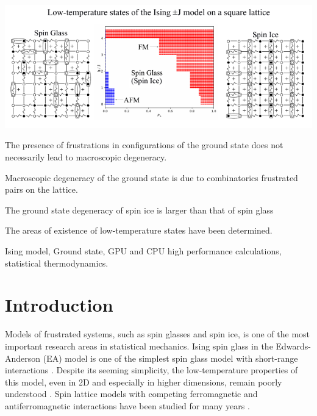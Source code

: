 \documentclass[preprint,12pt]{elsarticle}
\begin{document}
\begin{frontmatter}
\begin{abstract}
		\end{abstract}
		
		\begin{graphicalabstract}
		\includegraphics[width=1.2\linewidth]{Graphical Abstract.pdf}
		\end{graphicalabstract}
		
		
		\begin{highlights}  
			\item The presence of frustrations in configurations of the ground state does not necessarily lead to macroscopic degeneracy.
			\item Macroscopic degeneracy of the ground state is due to combinatorics frustrated pairs on the lattice.
			\item The ground state degeneracy of spin ice is larger than that of spin glass
			\item The areas of existence of low-temperature states have been determined.
		\end{highlights}  
		
		
		\begin{keyword}
			Ising model, Ground state, GPU and CPU high performance calculations, statistical thermodynamics.
		\end{keyword}
		
		
	\end{frontmatter}
	
	\linenumbers
	
	\tableofcontents
	
	\newpage
	\section{Introduction}
	
	Models of frustrated systems, such as spin glasses and spin ice, is one of the most important research areas in statistical mechanics. Ising spin glass in the Edwards-Anderson (EA) model is one of the simplest spin glass model with short-range interactions \cite{edwards1975theory}. Despite its seeming simplicity, the low-temperature properties of this model, even in 2D and especially in higher dimensions, remain poorly understood \cite{pal1996ground, hartmann2011ground, newman2022ground}. Spin lattice models with competing ferromagnetic and antiferromagnetic interactions have been studied for many years \cite{binder1986spin, mezard1987spin, lebrecht2004plaquette, valdes2012j, lebrecht2015j, fan2023searching}.
	
\end{document}
